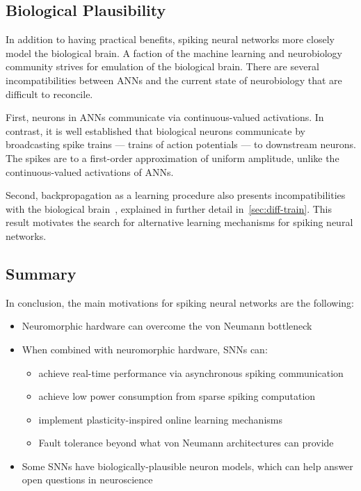 \documentclass[fyp]{socreport}
\begin{document}
\subsection{Biological Plausibility\label{bioplausible}}
In addition to having practical benefits, spiking neural networks more closely
model the biological brain. A faction of the machine learning and neurobiology
community strives for emulation of the biological brain. There are several
incompatibilities between ANNs and the current state of neurobiology that are
difficult to reconcile.

First, neurons in ANNs communicate via continuous-valued activations. In
contrast, it is well established that biological neurons communicate by
broadcasting spike trains --- trains of action potentials --- to downstream
neurons. The spikes are to a first-order approximation of uniform amplitude,
unlike the continuous-valued activations of ANNs.

Second, backpropagation as a learning procedure also presents incompatibilities
with the biological brain~\cite{TAVANAEI201947}, explained in further detail
in~\autoref{sec:diff-train}. This result motivates the search for alternative
learning mechanisms for spiking neural networks.

\subsection{Summary}
In conclusion, the main motivations for spiking neural networks are the
following:

\begin{itemize}
  \item Neuromorphic hardware can overcome the von Neumann bottleneck
  \item When combined with neuromorphic hardware, SNNs can:
  \begin{itemize}
    \item achieve real-time performance via asynchronous spiking communication
    \item achieve low power consumption from sparse spiking computation
    \item implement plasticity-inspired online learning mechanisms
    \item Fault tolerance beyond what von Neumann architectures can provide
  \end{itemize}
  \item Some SNNs have biologically-plausible neuron models, which can help
  answer open questions in neuroscience
\end{itemize}
\end{document}
